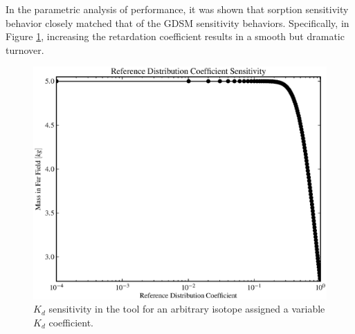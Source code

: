 
In the parametric analysis of \Cyder performance, it was shown that sorption
sensitivity behavior closely matched that of the \gls{GDSM} sensitivity
behaviors. Specifically, in Figure \ref{fig:kd_result}, increasing the retardation
coefficient results in a smooth but dramatic turnover.

\begin{figure}[ht]
\centering
\includegraphics[width=0.7\linewidth]{./results/images/kd.eps}
\caption[$K_d$ sensitivity in the Mixed Cell Model]{$K_d$ sensitivity in the
\Cyder tool for an arbitrary isotope assigned a variable $K_d$ coefficient.}
\label{fig:kd_result}
\end{figure}
